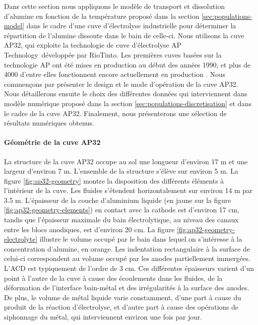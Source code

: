 Dans cette section nous appliquons le modèle de transport et
dissolution d'alumine en fonction de la température proposé dans la
section \ref{sec:populations-model} dans le cadre d'une cuve
d'électrolyse industrielle pour déterminer la répartition de l'alumine
dissoute dans le bain de celle-ci. Nous utilisons la cuve AP32, qui
exploite la technologie de cuve d'électrolyse AP
Technology\texttrademark\ développée par RioTinto. Les premières cuves
basées sur la technologie AP ont été mises en production au début des
années 1990, et plus de \num{4000} d'entre elles fonctionnent encore
actuellement en production \cite{RiotintoAP30}. Nous commençons par
présenter le design et le mode d'opération de la cuve AP32. Nous
détaillerons ensuite le choix des différentes données qui
interviennent dans modèle numérique proposé dans la section
\ref{sec:populations-discretisation} et dans le cadre de la cuve
AP32. Finalement, nous présenterons une sélection de résultats
numériques obtenus.



\paragraph{Géométrie de la cuve AP32} La structure de la cuve AP32
occupe au sol une longueur d'environ \num{17} \si{\meter} et une
largeur d'environ \num{7} \si{\meter}. L'ensemble de la structure
s'élève sur environ \num{5} \si{\meter}. La figure
\ref{fig:ap32-geometry} montre la disposition des différents éléments
à l'intérieur de la cuve. Les fluides s'étendent horizontalement sur
environ \num{14} \si{\meter} par \num{3.5} \si{\meter}. L'épaisseur de
la couche d'aluminium liquide (en jaune sur la figure
\ref{fig:ap32-geometry-elements}) en contact avec la cathode est
d'environ \num{17} \si{\centi\meter}, tandis que l'épaisseur maximale
du bain électrolytique, au niveau des canaux entre les blocs
anodiques, est d'environ \num{20} \si{\centi\meter}. La figure
\ref{fig:ap32-geometry-electrolyte} illustre le volume occupé par le
bain dans lequel on s'intéresse à la concentration d'alumine, en
orange. Les indentation rectangulaire à la surface de celui-ci
correspondent au volume occupé par les anodes partiellement
immergées. L'ACD est typiquement de l'ordre de \num{3}
\si{\centi\meter}. Ces différentes épaisseurs varient d'un point à
l'autre de la cuve à cause des écoulements dans les fluides, de la
déformation de l'interface bain-métal et des irrégularités à la
surface des anodes. De plus, le volume de métal liquide varie
constamment, d'une part à cause du produit de la réaction
d'électrolyse, et d'autre part à cause des opérations de siphonnage du
métal, qui interviennent environ une fois par jour.

